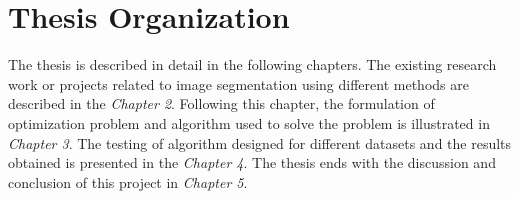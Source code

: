 \section{Thesis Organization}
The thesis is described in detail in the following chapters. The existing research work or projects related to image segmentation using different methods are described in the \emph{Chapter 2}. Following this chapter, the formulation of optimization problem and algorithm used to solve the problem is illustrated in \emph{Chapter 3}. The testing of algorithm designed for different datasets and the results obtained is presented in the \emph{Chapter 4}. The thesis ends with the discussion and conclusion of this project in \emph{Chapter 5}.


